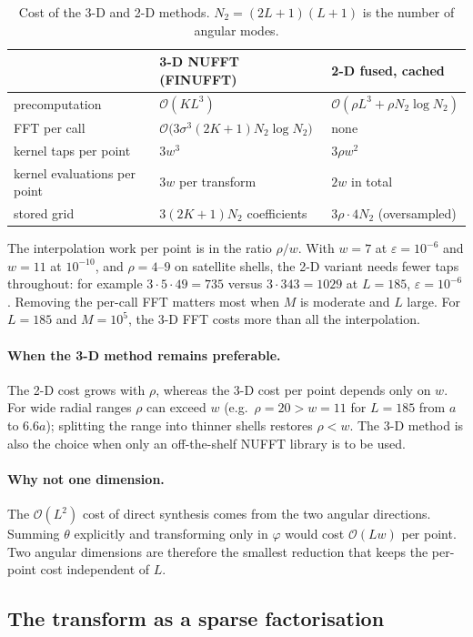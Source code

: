 \documentclass[11pt,a4paper]{article}
\theoremstyle{remark}
\newcommand{\eps}{\varepsilon}
\newcommand{\Oh}{\mathcal{O}}
\begin{document}
\begin{table}[!htbp]\centering\small
\caption{Cost of the 3-D and 2-D methods. $N_2=(2L+1)(L+1)$ is the number of angular modes.}\label{tab:cost2d}
\begin{tabular}{lll}\toprule
&3-D NUFFT (FINUFFT)&2-D fused, cached\\\midrule
precomputation&$\Oh(KL^3)$&$\Oh(\rho L^3+\rho N_2\log N_2)$\\
FFT per call&$\Oh\big(3\sigma^3(2K+1)N_2\log N_2\big)$&none\\
kernel taps per point&$3w^3$&$3\rho w^2$\\
kernel evaluations per point&$3w$ per transform&$2w$ in total\\
stored grid&$3(2K+1)N_2$ coefficients&$3\rho\cdot4N_2$ (oversampled)\\\bottomrule
\end{tabular}
\end{table}

The interpolation work per point is in the ratio $\rho/w$. With $w=7$ at $\eps=10^{-6}$ and $w=11$ at
$10^{-10}$, and $\rho=4$--$9$ on satellite shells, the 2-D variant needs fewer taps throughout:
for example $3\cdot5\cdot49=735$ versus $3\cdot343=1029$ at $L=185$, $\eps=10^{-6}$. Removing the
per-call FFT matters most when $M$ is moderate and $L$ large. For $L=185$ and
$M=10^5$, the 3-D FFT costs more than all the interpolation.

\paragraph{When the 3-D method remains preferable.} The 2-D cost grows with $\rho$, whereas the
3-D cost per point depends only on $w$. For wide radial ranges $\rho$ can exceed $w$ (e.g.\ $\rho=20>w=11$
for $L=185$ from $a$ to $6.6a$); splitting the range into thinner shells restores $\rho<w$. The 3-D
method is also the choice when only an off-the-shelf NUFFT library is to be used.

\paragraph{Why not one dimension.} The $\Oh(L^2)$ cost of direct synthesis comes from the two
angular directions. Summing $\theta$ explicitly and transforming only in $\varphi$ would cost
$\Oh(Lw)$ per point. Two angular dimensions are therefore the smallest reduction that keeps the
per-point cost independent of $L$.

\subsection{The transform as a sparse factorisation}\label{sec:factor}
\end{document}
